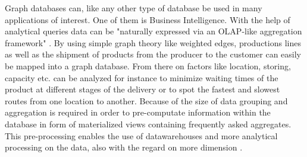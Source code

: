 Graph databases can, like any other type of database be used in many applications of interest. One of them is Business Intelligence. With the help of analytical queries data can be "naturally expressed via an OLAP-like aggregation framework" \cite{BI:2013}. By using simple graph theory like weighted edges, productions lines as well as the shipment of products from the producer to the customer can easily be mapped into a graph database. From there on factors like location, storing, capacity etc. can be analyzed for instance to minimize waiting times of the product at different stages of the delivery or to spot the fastest and slowest routes from one location to another. Because of the size of data grouping and aggregation is required in order to pre-computate information within the database in form of materialized views containing frequently asked aggregates. This pre-processing enables the use of datawarehouses and more analytical processing on the data, also with the regard on more dimension \cite{views}.